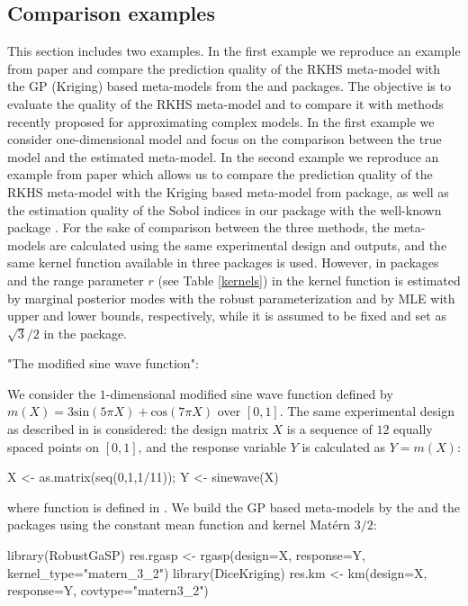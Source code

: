 \subsection{Comparison examples}\label{subsec:comprexpl}  
This section includes two examples. In the first example we reproduce an example from paper \citet{Gu_2019} and compare the prediction quality of the RKHS meta-model with the GP (Kriging) based meta-models from the  \citep{Gu_2019} and  \citep{JSSv051i01} packages. 
The objective is to evaluate the quality of the
RKHS meta-model and to compare it with methods recently
proposed for approximating complex models. In the first example we
consider one-dimensional model and focus on the comparison between the
true  model and the estimated meta-model. 
In the second example we reproduce an example from paper \citet{JSSv051i01} which allows us to compare the prediction quality of the RKHS meta-model with the Kriging based meta-model from  package, as well as the estimation quality of the Sobol indices in our package with the well-known package .  
For the sake of comparison between the three methods, the meta-models are calculated using
the same experimental design and outputs, and the same kernel function
available in three packages is used. However, in packages  and  the range parameter $r$ (see Table \ref{kernels}) in the kernel function is estimated by marginal posterior modes with the robust parameterization and by MLE with upper and lower bounds, respectively, while it is assumed to be fixed and set as $\sqrt{3}/2$ in the  package.  
\begin{exemp}\label{ex:comparisonPrediction} "The modified sine wave function":
\end{exemp}
We consider the $1$-dimensional modified sine wave function defined by $m(X)=3\mbox{sin}(5\pi X)+\mbox{cos}(7\pi X)$ over $[0,1]$.
The same experimental design as described in \citet{Gu_2019} is considered: the design matrix $X$ is a sequence of $12$ equally spaced points on $[0,1]$, and the response variable $Y$ is calculated as $Y = m(X)$:
\begin{example}
X <- as.matrix(seq(0,1,1/11)); Y <- sinewave(X)
\end{example}
where  function is defined in \citet{Gu_2019}. 
We build the GP based meta-models by the  and the  packages using the constant mean function and kernel Matérn $3/2$:
\begin{example}
library(RobustGaSP)
res.rgasp <- rgasp(design=X, response=Y, kernel_type="matern_3_2")
library(DiceKriging)
res.km <- km(design=X, response=Y, covtype="matern3_2")
\end{example} 
